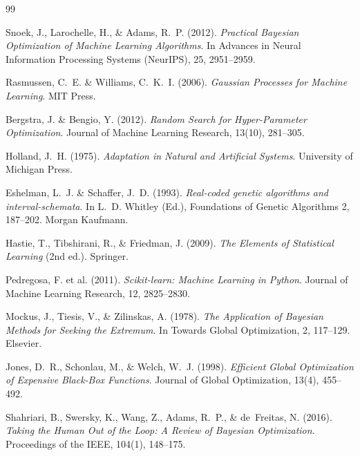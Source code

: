 \documentclass[12pt,a4paper]{article}
\begin{document}
\newpage
\begin{thebibliography}{99}

Snoek, J., Larochelle, H., \& Adams, R.~P. (2012).
\textit{Practical Bayesian Optimization of Machine Learning Algorithms}.
In Advances in Neural Information Processing Systems (NeurIPS), 25, 2951--2959.

Rasmussen, C.~E. \& Williams, C.~K.~I. (2006).
\textit{Gaussian Processes for Machine Learning}.
MIT Press.

Bergstra, J. \& Bengio, Y. (2012).
\textit{Random Search for Hyper-Parameter Optimization}.
Journal of Machine Learning Research, 13(10), 281--305.

Holland, J.~H. (1975).
\textit{Adaptation in Natural and Artificial Systems}.
University of Michigan Press.

Eshelman, L.~J. \& Schaffer, J.~D. (1993).
\textit{Real-coded genetic algorithms and interval-schemata}.
In L.~D. Whitley (Ed.), Foundations of Genetic Algorithms 2, 187--202.
Morgan Kaufmann.

Hastie, T., Tibshirani, R., \& Friedman, J. (2009).
\textit{The Elements of Statistical Learning} (2nd ed.).
Springer.

Pedregosa, F. et al. (2011).
\textit{Scikit-learn: Machine Learning in Python}.
Journal of Machine Learning Research, 12, 2825--2830.

Mockus, J., Tiesis, V., \& Zilinskas, A. (1978).
\textit{The Application of Bayesian Methods for Seeking the Extremum}.
In Towards Global Optimization, 2, 117--129. Elsevier.

Jones, D.~R., Schonlau, M., \& Welch, W.~J. (1998).
\textit{Efficient Global Optimization of Expensive Black-Box Functions}.
Journal of Global Optimization, 13(4), 455--492.

Shahriari, B., Swersky, K., Wang, Z., Adams, R.~P., \& de~Freitas, N. (2016).
\textit{Taking the Human Out of the Loop: A Review of Bayesian Optimization}.
Proceedings of the IEEE, 104(1), 148--175.

\end{thebibliography}
\end{document}
